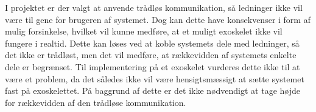 I projektet er der valgt at anvende trådløs kommunikation, så ledninger ikke vil være til gene for brugeren af systemet. Dog kan dette have konsekvenser i form af mulig forsinkelse, hvilket vil kunne medføre, at et muligt exoskelet ikke vil fungere i realtid. Dette kan løses ved at koble systemets dele med ledninger, så det ikke er trådløst, men det vil medføre, at rækkevidden af systemets enkelte dele er begrænset. Til implementering på et exoskelet vurderes dette ikke til at være et problem, da det således ikke vil være hensigtsmæssigt at sætte systemet fast på exoskelettet. På baggrund af dette er det ikke nødvendigt at tage højde for rækkevidden af den trådløse kommunikation.







